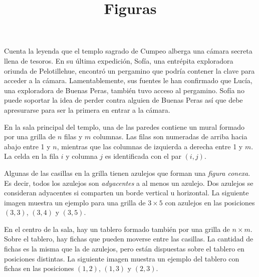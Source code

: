 \documentclass{oci}
\title{Figuras}
\def\nrows{3}
\def\ncols{5}
\newcommand{\drawnumbers}{
  \foreach \col in {1, ..., \ncols} {
    \node at (\col - 0.5, 3.35) {\col};
  }
  \foreach \row in {1, ..., \nrows} {
    \node at (-0.35, \nrows - \row + 0.5) {\row};
  }
}
\begin{document}
\begin{problemDescription}
Cuenta la leyenda que el templo sagrado de Cumpeo alberga una cámara
secreta llena de tesoros.
%
En su última expedición, Sofía, una entrépita exploradora oriunda de
Pelotillehue, encontró un pergamino que podría contener la clave para
acceder a la cámara.
%
Lamentablemente, sus fuentes le han confirmado que Lucía, una exploradora
de Buenas Peras, también tuvo acceso al pergamino.
%
Sofía no puede soportar la idea de perder contra alguien de Buenas Peras
así que debe apresurarse para ser la primera en entrar a la cámara.

En la sala principal del templo, una de las paredes contiene un mural
formado por una grilla de $n$ filas y $m$ columnas.
%
Las filas son numeradas de arriba hacia abajo entre 1 y $n$, mientras
que las columnas de izquierda a derecha entre 1 y $m$.
%
La celda en la fila $i$ y columna $j$ es identificada con el par $(i, j)$.

Algunas de las casillas en la grilla tienen azulejos que forman
una \emph{figura conexa}.
%
Es decir, todos los azulejos son \emph{adyacentes} a al menos un azulejo.
%
Dos azulejos se consideran adyacentes si comparten un borde vertical
u horizontal.
%
La siguiente imagen muestra un ejemplo para una grilla de $3\times 5$
con azulejos en las posiciones $(3, 3)$, $(3, 4)$ y $(3, 5)$.

\begin{center}
\end{center}

En el centro de la sala, hay un tablero formado también por
una grilla de $n\times m$.
%
Sobre el tablero, hay fichas que pueden moverse entre
las casillas.
%
La cantidad de fichas es la misma que la de azulejos, pero
están dispuestas sobre el tablero en posiciones distintas.
%
La siguiente imagen muestra un ejemplo del tablero con fichas
en las posiciones $(1, 2)$, $(1, 3)$ y $(2, 3)$.


\begin{center}
\end{center}


\end{problemDescription}
\end{document}
